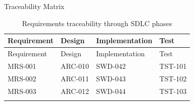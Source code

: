 \documentclass[
  11pt,
  ignorenonframetext,
  aspectratio=169,
]{beamer}
\begin{document}
\begin{frame}{Traceability Matrix}
\label{traceability-matrix}
\begin{longtable}[]{@{}
  >{\raggedright\arraybackslash}p{}
  >{\raggedright\arraybackslash}p{}
  >{\raggedright\arraybackslash}p{}
  >{\raggedright\arraybackslash}p{}@{}}
\caption{Requirements traceability through SDLC phases}\tabularnewline
\toprule\noalign{}
\begin{minipage}[b]{\linewidth}\raggedright
Requirement
\end{minipage} & \begin{minipage}[b]{\linewidth}\raggedright
Design
\end{minipage} & \begin{minipage}[b]{\linewidth}\raggedright
Implementation
\end{minipage} & \begin{minipage}[b]{\linewidth}\raggedright
Test
\end{minipage} \\
\midrule\noalign{}
\endfirsthead
\toprule\noalign{}
\begin{minipage}[b]{\linewidth}\raggedright
Requirement
\end{minipage} & \begin{minipage}[b]{\linewidth}\raggedright
Design
\end{minipage} & \begin{minipage}[b]{\linewidth}\raggedright
Implementation
\end{minipage} & \begin{minipage}[b]{\linewidth}\raggedright
Test
\end{minipage} \\
\midrule\noalign{}
\endhead
MRS-001 & ARC-010 & SWD-042 & TST-101 \\
MRS-002 & ARC-011 & SWD-043 & TST-102 \\
MRS-003 & ARC-012 & SWD-044 & TST-103 \\
\bottomrule\noalign{}
\end{longtable}
\end{frame}
\end{document}
